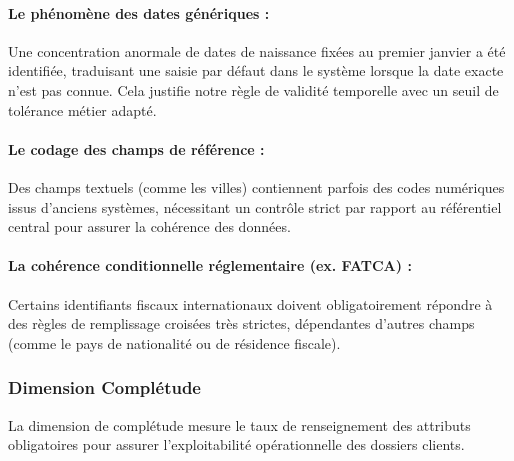 \paragraph{Le phénomène des dates génériques :} Une concentration anormale de dates de naissance fixées au premier janvier a été identifiée, traduisant une saisie par défaut dans le système lorsque la date exacte n'est pas connue. Cela justifie notre règle de validité temporelle avec un seuil de tolérance métier adapté.

\paragraph{Le codage des champs de référence :} Des champs textuels (comme les villes) contiennent parfois des codes numériques issus d'anciens systèmes, nécessitant un contrôle strict par rapport au référentiel central pour assurer la cohérence des données.

\paragraph{La cohérence conditionnelle réglementaire (ex. FATCA) :} Certains identifiants fiscaux internationaux doivent obligatoirement répondre à des règles de remplissage croisées très strictes, dépendantes d'autres champs (comme le pays de nationalité ou de résidence fiscale).

\subsubsection{Dimension Complétude}
La dimension de complétude mesure le taux de renseignement des attributs obligatoires pour assurer l'exploitabilité opérationnelle des dossiers clients.

